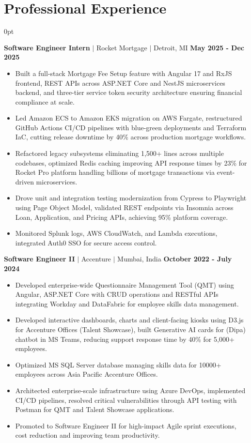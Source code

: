 \documentclass[letterpaper,10pt]{article}
\newlength{\contentindent}
\newcommand{\sectioncontent}[1]{%
  \begin{adjustwidth}{\contentindent}{0pt}%
  #1%
  \end{adjustwidth}%
}
\begin{document}
\section{Professional Experience}
\sectioncontent{
\textbf{Software Engineer Intern} $|$ Rocket Mortgage $|$ Detroit, MI \hfill \textbf{May 2025 - Dec 2025}
\begin{itemize}
    \item Built a full-stack Mortgage Fee Setup feature with Angular 17 and RxJS frontend, REST APIs across ASP.NET Core and NestJS microservices backend, and three-tier service token security architecture ensuring financial compliance at scale.
    \item Led Amazon ECS to Amazon EKS migration on AWS Fargate, restructured GitHub Actions CI/CD pipelines with blue-green deployments and Terraform IaC, cutting release downtime by 40\% across production mortgage workflows.
    \item Refactored legacy subsystems eliminating 1,500+ lines across multiple codebases, optimized Redis caching improving API response times by 23\% for Rocket Pro platform handling billions of mortgage transactions via event-driven microservices.
    \item Drove unit and integration testing modernization from Cypress to Playwright using Page Object Model, validated REST endpoints via Insomnia across Loan, Application, and Pricing APIs, achieving 95\% platform coverage.
    \item Monitored Splunk logs, AWS CloudWatch, and Lambda executions, integrated Auth0 SSO for secure access control.
\end{itemize}

\textbf{Software Engineer II} $|$ Accenture $|$ Mumbai, India \hfill \textbf{October 2022 - July 2024}
\begin{itemize}
    \item Developed enterprise-wide Questionnaire Management Tool (QMT) using Angular, ASP.NET Core with CRUD operations and RESTful APIs integrating Workday and DataFabric for employee skills data management.
    \item Developed interactive dashboards, charts and client-facing kiosks using D3.js for Accenture Offices (Talent Showcase), built Generative AI cards for (Dipa) chatbot in MS Teams, reducing support response time by 40\% for 5,000+ employees.
    \item Optimized MS SQL Server database managing skills data for 10000+ employees across Asia Pacific Accenture Offices.
    \item Architected enterprise-scale infrastructure using Azure DevOps, implemented CI/CD pipelines, resolved critical vulnerabilities through API testing with Postman for QMT and Talent Showcase applications.
    \item Promoted to Software Engineer II for high-impact Agile sprint executions, cost reduction and improving team productivity.
\end{itemize}}
\end{document}
